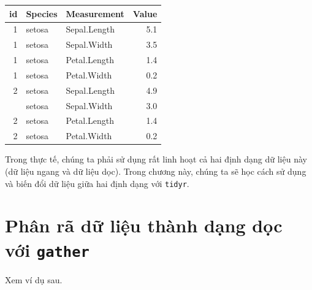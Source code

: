 \documentclass[]{krantz}
\makeatletter
\newenvironment{Shaded}{\begin{snugshade}}{\end{snugshade}}
\newcommand{\DataTypeTok}[1]{\textcolor[rgb]{0.27,0.27,0.27}{#1}}
\newcommand{\DecValTok}[1]{\textcolor[rgb]{0.06,0.06,0.06}{#1}}
\newcommand{\KeywordTok}[1]{\textcolor[rgb]{0.27,0.27,0.27}{\textbf{#1}}}
\newcommand{\NormalTok}[1]{#1}
\newcommand{\OperatorTok}[1]{\textcolor[rgb]{0.43,0.43,0.43}{\textbf{#1}}}
\newcommand{\StringTok}[1]{\textcolor[rgb]{0.5,0.5,0.5}{#1}}
\newenvironment{kframe}{%
\medskip{}
\setlength{\fboxsep}{.8em}
 \def\at@end@of@kframe{}%
 \ifinner\ifhmode%
  \def\at@end@of@kframe{\end{minipage}}%
  \begin{minipage}{\columnwidth}%
 \fi\fi%
 \def\FrameCommand##1{\hskip\@totalleftmargin \hskip-\fboxsep
 \colorbox{shadecolor}{##1}\hskip-\fboxsep
     \hskip-\linewidth \hskip-\@totalleftmargin \hskip\columnwidth}%
 \MakeFramed {\advance\hsize-\width
   \@totalleftmargin\z@ \linewidth\hsize
   \@setminipage}}%
 {\par\unskip\endMakeFramed%
 \at@end@of@kframe}
\renewenvironment{Shaded}{\begin{kframe}}{\end{kframe}}
\renewenvironment{Shaded}{\begin{snugshade}}{\end{snugshade}}
\renewcommand{\DataTypeTok}[1]{\textcolor[rgb]{0.13,0.29,0.53}{#1}}
\renewcommand{\DecValTok}[1]{\textcolor[rgb]{0.00,0.00,0.81}{#1}}
\renewcommand{\KeywordTok}[1]{\textcolor[rgb]{0.13,0.29,0.53}{\textbf{#1}}}
\renewcommand{\NormalTok}[1]{#1}
\renewcommand{\OperatorTok}[1]{\textcolor[rgb]{0.81,0.36,0.00}{\textbf{#1}}}
\renewcommand{\StringTok}[1]{\textcolor[rgb]{0.31,0.60,0.02}{#1}}
\theoremstyle{definition}
\theoremstyle{definition}
\theoremstyle{definition}
\theoremstyle{remark}
\makeatother
\begin{document}
\begin{tabular}{rllr}
\toprule
id & Species & Measurement & Value\\
\midrule
1 & setosa & Sepal.Length & 5.1\\
1 & setosa & Sepal.Width & 3.5\\
1 & setosa & Petal.Length & 1.4\\
1 & setosa & Petal.Width & 0.2\\
2 & setosa & Sepal.Length & 4.9\\
\addlinespace
2 & setosa & Sepal.Width & 3.0\\
2 & setosa & Petal.Length & 1.4\\
2 & setosa & Petal.Width & 0.2\\
\bottomrule
\end{tabular}

Trong thực tế, chúng ta phải sử dụng rất linh hoạt cả hai định dạng dữ
liệu này (dữ liệu ngang và dữ liệu dọc). Trong chương này, chúng ta sẽ
học cách sử dụng và biến đổi dữ liệu giữa hai định dạng với
\texttt{tidyr}.

\hypertarget{phan-ra-d-liu-thanh-dang-doc-vi-gather}{%
\section{\texorpdfstring{Phân rã dữ liệu thành dạng dọc với
\texttt{gather}}{Phân rã dữ liệu thành dạng dọc với gather}}\label{phan-ra-d-liu-thanh-dang-doc-vi-gather}}

\begin{Shaded}
\end{Shaded}

Xem ví dụ sau.

\begin{Shaded}
\end{Shaded}
\end{document}

